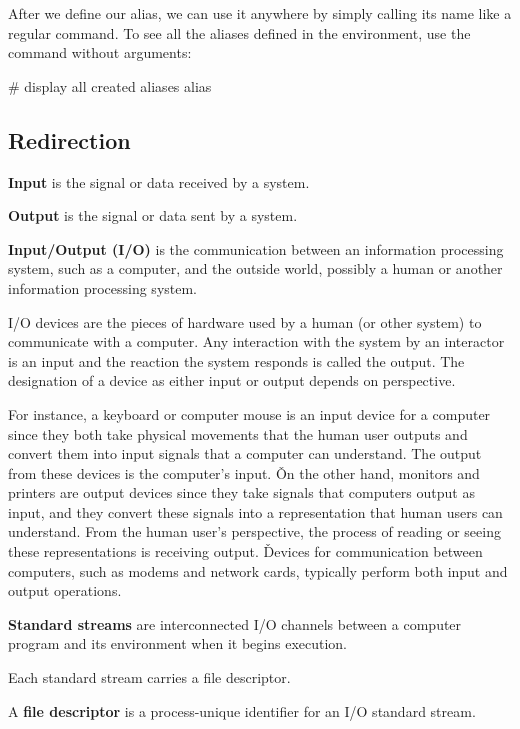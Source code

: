 After we define our alias, we can use it anywhere by simply calling its name like a regular command. To see all the
aliases defined in the environment, use the  command without arguments:
\begin{bash}
# display all created aliases
alias
\end{bash}

\subsection{Redirection}

\bd[Input]
\textbf{Input} is the signal or data received by a system.
\ed

\bd[Output]
\textbf{Output} is the signal or data sent by a system.
\ed

\textbf{Input/Output (I/O)} is the communication between an information processing system, such as a computer, and
the outside world, possibly a human or another information processing system.
\ed

I/O devices are the pieces of hardware used by a human (or other system) to communicate with a computer. Any
interaction with the system by an interactor is an input and the reaction the system responds is called the output.
The designation of a device as either input or output depends on perspective.

\be
For instance, a keyboard or computer mouse is an input device for a computer since they both take physical
movements that the human user outputs and convert them into input signals that a computer can understand. The output
from these devices is the computer's input. \v

On the other hand, monitors and printers are output devices since they take signals that computers output as input,
and they convert these signals into a representation that human users can understand. From the human user's perspective,
the process of reading or seeing these representations is receiving output. \v

Devices for communication between computers, such as modems and network cards, typically perform both input and
output operations.
\ee

\textbf{Standard streams} are interconnected I/O channels between a computer program and its environment when it begins
execution.
\ed

Each standard stream carries a file descriptor.

A \textbf{file descriptor} is a process-unique identifier for an I/O standard stream.
\ed


